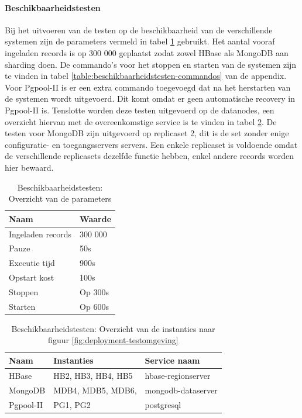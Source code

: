 \paragraph{Beschikbaarheidstesten} Bij het uitvoeren van de testen op de beschikbaarheid van de verschillende systemen zijn de parameters vermeld in tabel \ref{table:beschikbaarheidstesten-parameters} gebruikt. Het aantal vooraf ingeladen records is op 300 000 geplaatst zodat zowel HBase als MongoDB aan sharding doen. De commando's voor het stoppen en starten van de systemen zijn te vinden in tabel \ref{table:beschikbaarheidstesten-commandos} van de appendix.  Voor Pgpool-II is er een extra commando toegevoegd dat na het herstarten van de systemen wordt uitgevoerd. Dit komt omdat er geen automatische recovery in Pgpool-II is. Tenslotte worden deze testen uitgevoerd op de datanodes, een overzicht hiervan met de overeenkomstige service is te vinden in tabel \ref{table:beschikbaarheidstesten-nodes}. De testen voor MongoDB zijn uitgevoerd op replicaset 2, dit is de set zonder enige configuratie- en toegangsservers servers. Een enkele replicaset is voldoende omdat de verschillende replicasets dezelfde functie hebben, enkel andere records worden hier bewaard. 

\begin{table}[ht!]
	\centering
	\begin{tabular}{l| l }
		\textbf{Naam} & \textbf{Waarde}  \\
		\hline
		Ingeladen records  & 300 000 \\
		Pauze & 50s \\
		Executie tijd & 900s \\
		Opstart kost & 100s \\
		Stoppen & Op 300s \\
		Starten & Op 600s \\
	\end{tabular}
	\caption{Beschikbaarheidstesten: Overzicht van de parameters}
	\label{table:beschikbaarheidstesten-parameters}
\end{table}


\begin{table}[ht!]
	\centering
	\begin{tabular}{l| l l }
		\textbf{Naam} & \textbf{Instanties} & \textbf{Service naam} \\
		\hline
		HBase  & HB2, HB3, HB4, HB5 & hbase-regionserver \\
		MongoDB  & MDB4, MDB5, MDB6, & mongodb-dataserver\\
		Pgpool-II  & PG1, PG2 & postgresql \\
	\end{tabular}
	\caption{Beschikbaarheidstesten: Overzicht van de instanties naar figuur \ref{fig:deployment-testomgeving}}
	\label{table:beschikbaarheidstesten-nodes}
\end{table}

